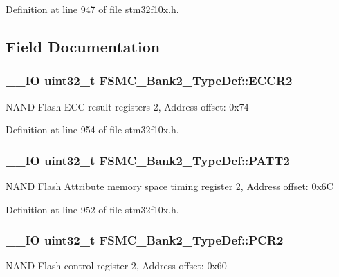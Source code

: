 Definition at line 947 of file stm32f10x.\-h.



\subsection{Field Documentation}
\hypertarget{struct_f_s_m_c___bank2___type_def_afebea17b3ac79d86ad59ce299ab5dd83}{
\subsubsection[{E\-C\-C\-R2}]{\setlength{\rightskip}{0pt plus 5cm}\-\_\-\-\_\-\-I\-O {\bf uint32\-\_\-t} F\-S\-M\-C\-\_\-\-Bank2\-\_\-\-Type\-Def\-::\-E\-C\-C\-R2}}\label{struct_f_s_m_c___bank2___type_def_afebea17b3ac79d86ad59ce299ab5dd83}
N\-A\-N\-D Flash E\-C\-C result registers 2, Address offset\-: 0x74 

Definition at line 954 of file stm32f10x.\-h.

\hypertarget{struct_f_s_m_c___bank2___type_def_a9b2c273e4b84f24efbd731bd4ba76a84}{
\subsubsection[{P\-A\-T\-T2}]{\setlength{\rightskip}{0pt plus 5cm}\-\_\-\-\_\-\-I\-O {\bf uint32\-\_\-t} F\-S\-M\-C\-\_\-\-Bank2\-\_\-\-Type\-Def\-::\-P\-A\-T\-T2}}\label{struct_f_s_m_c___bank2___type_def_a9b2c273e4b84f24efbd731bd4ba76a84}
N\-A\-N\-D Flash Attribute memory space timing register 2, Address offset\-: 0x6\-C 

Definition at line 952 of file stm32f10x.\-h.

\hypertarget{struct_f_s_m_c___bank2___type_def_ad1eabc89a4eadb5cc6a42c1e39a39ff8}{
\subsubsection[{P\-C\-R2}]{\setlength{\rightskip}{0pt plus 5cm}\-\_\-\-\_\-\-I\-O {\bf uint32\-\_\-t} F\-S\-M\-C\-\_\-\-Bank2\-\_\-\-Type\-Def\-::\-P\-C\-R2}}\label{struct_f_s_m_c___bank2___type_def_ad1eabc89a4eadb5cc6a42c1e39a39ff8}
N\-A\-N\-D Flash control register 2, Address offset\-: 0x60 

